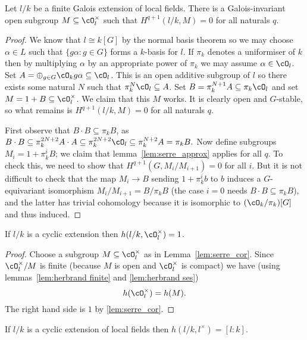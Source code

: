 \begin{lemma}\label{lem:serre_cor}
	Let $l/k$ be a finite Galois extension of local fields.
	There is a Galois-invariant open subgroup $M \subseteq \cO_l^\times$
	such that $H^{q+1}(l/k,M)=0$ for all naturals $q$.
\end{lemma}
\begin{proof}
  We know that $l\cong k[G]$ by the normal basis theorem so we may choose $\alpha\in L$
	such that $\{g\alpha:g\in G\}$ forms a $k$-basis for $l$. If $\pi_k$ denotes a uniformiser of $k$
	then by multiplying $\alpha$ by an appropriate power of $\pi_k$ we may assume
	$\alpha\in\cO_l$. Set $A=\oplus_{g\in G}\cO_k g\alpha\subseteq\cO_l$. This is an
	open additive subgroup of $l$
	so there exists some natural $N$ such that $\pi_k^N\cO_l\subseteq A$. Set
	$B=\pi_k^{N+1}A\subseteq\pi_k\cO_l$ and set $M=1+B\subseteq \cO_l^\times$. We claim that this
	$M$ works. It is clearly open and $G$-stable, so what remains is $H^{q+1}(l/k,M)=0$
	for all naturals $q$.

	First observe that $B\cdot B\subseteq \pi_kB$, as $B\cdot B\subseteq\pi_k^{2N+2}A\cdot A
	\subseteq \pi_k^{2N+2}\cO_l\subseteq \pi_k^{N+2}A=\pi_kB.$ Now define subgroups
	$M_i=1+\pi_k^iB$; we claim that lemma~\ref{lem:serre_approx} applies for all $q$.
	To check this, we need to show that $H^{q+1}(G,M_i/M_{i+1})=0$ for all $i$. But
	it is not difficult
	to check that the map $M_i\to B$ sending $1+\pi_k^ib$ to $b$ induces a $G$-equivariant
	isomorphism $M_i/M_{i+1}=B/\pi_kB$ (the case $i=0$ needs $B\cdot B\subseteq \pi_kB$),
	and the latter has trivial cohomology because it is isomorphic to $(\cO_k/\pi_k)[G]$
	and thus induced.
\end{proof}

\begin{lemma}\label{lem:herbrand local units}
	If $l/k$ is a cyclic extension then $h(l/k, \cO_l^\times) = 1$.
\end{lemma}

\begin{proof}
	Choose a subgroup $M\subseteq \cO_l^\times$ as in Lemma~\ref{lem:serre_cor}.
	Since $\cO_l^\times / M$ is finite (because $M$ is open and $\cO_l^\times$ is compact)
	we have
	(using lemmas~\ref{lem:herbrand finite} and \ref{lem:herbrand ses})
	\[
		h(\cO_l^\times) = h(M).
	\]
	The right hand side is $1$ by \ref{lem:serre_cor}.
\end{proof}

\begin{lemma} \label{lem:herbrand local l*}
	If $l/k$ is a cyclic extension of local fields
	then $h(l/k, l^\times)= [l:k]$.
\end{lemma}

